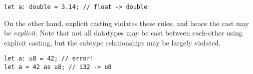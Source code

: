 \begin{lstlisting}[language=CustomLang]
let a: double = 3.14; // float -> double
\end{lstlisting}

On the other hand, explicit casting violates these rules, and hence the cast may be \textit{explicit}.
Note that not all datatypes may be cast between each-other using explicit casting, but the subtype relationships may be largely violated.

\begin{lstlisting}[language=CustomLang]
let a: u8 = 42; // error!
let a = 42 as u8; // i32 -> u8
\end{lstlisting}
